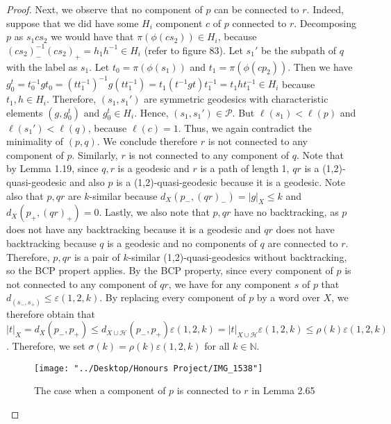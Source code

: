 \documentclass[12pt]{article}
\begin{document}
\begin{proof}
		Next, we observe that no component of $p$ can be connected to $r$. Indeed, suppose that we did have some $H_i$ component $c$ of $p$ connected to $r$. Decomposing $p$ as $s_1 c s_2$ we would have that $\pi(\phi(c s_2)) \in H_i$, because $(c s_2)_{-}^{-1}(c s_2)_{+} = h_1 h^{-1} \in H_i$ (refer to figure 83). Let $s_1'$ be the subpath of $q$ with the label as $s_1$. Let $t_0 = \pi(\phi(s_1))$ and $t_1 = \pi(\phi(c p_2))$. Then we have $g^t_0 = t_0^{-1} g t_0 = (t t_1^{-1})^{-1} g (t t_1^{-1})= t_1  (t^{-1} g t) t_1^{-1} = t_1 h t_1^{-1} \in H_i$ because $t_1, h \in H_i$. Therefore, $(s_1,s_1')$ are symmetric geodesics with characteristic elements $(g, g^t_0)$ and $g^t_0 \in H_i$. Hence, $(s_1, s_1') \in \mathcal{P}$. But $\ell(s_1) < \ell(p)$ and $\ell(s_1') < \ell(q)$, because $\ell(c) = 1$. Thus, we again contradict the minimality of $(p,q)$. We conclude therefore $r$ is not connected to any component of $p$. Similarly, $r$ is not connected to any component of $q$. Note that by Lemma 1.19, since $q,r$ is a geodesic and $r$ is a path of length 1, $qr$ is a (1,2)-quasi-geodesic and also $p$ is a (1,2)-quasi-geodesic because it is a geodesic. Note also that $p, qr$ are $k$-similar because $d_X(p_{-}, (qr)_{-}) = \vert g \vert_X \leq k$ and $d_X(p_{+}, (qr)_{+}) = 0$. Lastly, we also note that $p,qr$ have no backtracking, as $p$ does not have any backtracking because it is a geodesic and $qr$ does not have backtracking because $q$ is a geodesic and no components of $q$ are connected to $r$. Therefore, $p, qr$ is a pair of $k$-similar (1,2)-quasi-geodesics without backtracking, so the BCP propert applies. By the BCP property, since every component of $p$ is not connected to any component of $qr$, we have for any component $s$ of $p$ that $d_(s_{-}, s_{+}) \leq \varepsilon(1,2,k)$. By replacing every component of $p$ by a word over $X$, we therefore obtain that $\vert t \vert_X = d_X(p_{-}, p_{+}) \leq d_{X \cup \mathcal{H}}(p_{-}, p_{+}) \varepsilon(1,2,k) = \vert t \vert_{X \cup \mathcal{H}} \varepsilon(1,2,k) \leq \rho(k) \varepsilon(1,2,k)$. Therefore, we set $\sigma(k) = \rho(k) \varepsilon(1,2,k)$ for all $k \in \mathbb{N}$.
		
\begin{figure} [H]
	\centering
	\texttt{[image: "../Desktop/Honours Project/IMG\_1538"]}
	\caption{The case when a component of $p$ is connected to $r$ in Lemma 2.65}
	\label{fig:img1538}
\end{figure}
		
	\end{proof}
\end{document}

